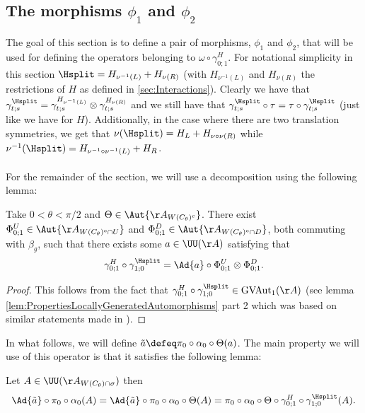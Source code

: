 \subsection{The morphisms \texorpdfstring{$\phi_1$}{} and \texorpdfstring{$\phi_2$}{}}
The goal of this section is to define a pair of morphisms, $\phi_1$ and $\phi_2$, that will be used for defining the operators belonging to $\omega\circ\gamma^H_{0;1}$. For notational simplicity in this section $\Hsplit=H_{\nu^{-1}(L)}+H_{\nu(R)}$ (with $H_{\nu^{-1}(L)}$ and $H_{\nu(R)}$ the restrictions of $H$ as defined in \ref{sec:Interactions}). Clearly we have that $\gamma^{\Hsplit}_{t;s}=\gamma^{H_{\nu^{-1}(L)}}_{t;s}\otimes\gamma^{H_{\nu(R)}}_{t;s}$ and we still have that $\gamma^{\Hsplit}_{t;s}\circ\tau=\tau\circ\gamma^{\Hsplit}_{t;s}$ (just like we have for $H$). Additionally, in the case where there are two translation symmetries, we get that $\nu(\Hsplit)=H_L+H_{\nu\circ\nu(R)}$ while $\nu^{-1}(\Hsplit)=H_{\nu^{-1}\circ\nu^{-1}(L)}+H_{R}$.\\\\
For the remainder of the section, we will use a decomposition using the following lemma:
\begin{lemma}\label{lem:DefinitionOfGroupMorphismVAutEquation}
	Take $0<\theta<\pi/2$ and $\Theta\in \Aut{\AA_{W(C_\theta)^c}}$. There exist $\Phi^U_{0;1}\in\Aut{\AA_{W(C_\theta)^c\cap U}}$ and $\Phi^D_{0;1}\in\Aut{\AA_{W(C_\theta)^c\cap D}}$, both commuting with $\beta_g$, such that there exists some $a\in\UU(\AA)$ satisfying that
	\begin{equation}\label{eq:DefinitionOfGroupMorphismVAutEquation}
		\gamma^H_{0;1}\circ\gamma^{\Hsplit}_{1;0}=\Ad{a}\circ \Phi^U_{0;1}\otimes\Phi^D_{0;1}.
	\end{equation}
\end{lemma}
\begin{proof}
	This follows from the fact that $\gamma^H_{0;1}\circ\gamma^{\Hsplit}_{1;0}\in \textrm{GVAut}_1(\AA)$ (see lemma \ref{lem:PropertiesLocallyGeneratedAutomorphisms} part 2 which was based on similar statements made in \cite{Ogata2d}).
\end{proof}
In what follows, we will define $\tilde{a}\defeq \pi_0\circ\alpha_0\circ\Theta(a)$. The main property we will use of this operator is that it satisfies the following lemma:
\begin{lemma}\label{lem:PropertyTilde_a}
	Let $A\in\UU(\AA_{W(C_\theta)\cap\sigma})$ then
	\begin{equation}
		\Ad{\tilde{a}}\circ\pi_0\circ\alpha_0(A)=\Ad{\tilde{a}}\circ\pi_0\circ\alpha_0\circ\Theta(A)=\pi_0\circ\alpha_0\circ\Theta\circ\gamma^H_{0;1}\circ\gamma^{\Hsplit}_{1;0}(A).
	\end{equation}
\end{lemma}
